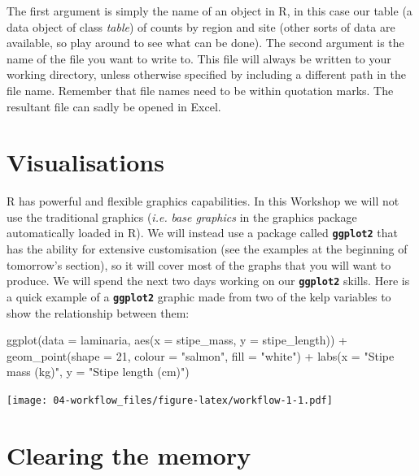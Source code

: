 \documentclass[
]{book}
\newenvironment{Shaded}{\begin{snugshade}}{\end{snugshade}}
\newcommand{\AttributeTok}[1]{\textcolor[rgb]{0.77,0.63,0.00}{#1}}
\newcommand{\DecValTok}[1]{\textcolor[rgb]{0.00,0.00,0.81}{#1}}
\newcommand{\FunctionTok}[1]{\textcolor[rgb]{0.00,0.00,0.00}{#1}}
\newcommand{\NormalTok}[1]{#1}
\newcommand{\SpecialCharTok}[1]{\textcolor[rgb]{0.00,0.00,0.00}{#1}}
\newcommand{\StringTok}[1]{\textcolor[rgb]{0.31,0.60,0.02}{#1}}
\begin{document}
The first argument is simply the name of an object in R, in this case our table (a data object of class \emph{table}) of counts by region and site (other sorts of data are available, so play around to see what can be done). The second argument is the name of the file you want to write to. This file will always be written to your working directory, unless otherwise specified by including a different path in the file name. Remember that file names need to be within quotation marks. The resultant file can sadly be opened in Excel.

\hypertarget{visualisations}{%
\section{Visualisations}\label{visualisations}}

R has powerful and flexible graphics capabilities. In this Workshop we will not use the traditional graphics (\emph{i.e.} \emph{base graphics} in the graphics package automatically loaded in R). We will instead use a package called \textbf{\texttt{ggplot2}} that has the ability for extensive customisation (see the examples at the beginning of tomorrow's section), so it will cover most of the graphs that you will want to produce. We will spend the next two days working on our \textbf{\texttt{ggplot2}} skills. Here is a quick example of a \textbf{\texttt{ggplot2}} graphic made from two of the kelp variables to show the relationship between them:

\begin{Shaded}
\begin{Highlighting}[]
\FunctionTok{ggplot}\NormalTok{(}\AttributeTok{data =}\NormalTok{ laminaria, }\FunctionTok{aes}\NormalTok{(}\AttributeTok{x =}\NormalTok{ stipe\_mass, }\AttributeTok{y =}\NormalTok{ stipe\_length)) }\SpecialCharTok{+}
  \FunctionTok{geom\_point}\NormalTok{(}\AttributeTok{shape =} \DecValTok{21}\NormalTok{, }\AttributeTok{colour =} \StringTok{"salmon"}\NormalTok{, }\AttributeTok{fill =} \StringTok{"white"}\NormalTok{) }\SpecialCharTok{+}
  \FunctionTok{labs}\NormalTok{(}\AttributeTok{x =} \StringTok{"Stipe mass (kg)"}\NormalTok{, }\AttributeTok{y =} \StringTok{"Stipe length (cm)"}\NormalTok{)}
\end{Highlighting}
\end{Shaded}

\texttt{[image: 04-workflow\_files/figure-latex/workflow-1-1.pdf]}

\hypertarget{clearing-the-memory}{%
\section{Clearing the memory}\label{clearing-the-memory}}
\end{document}

